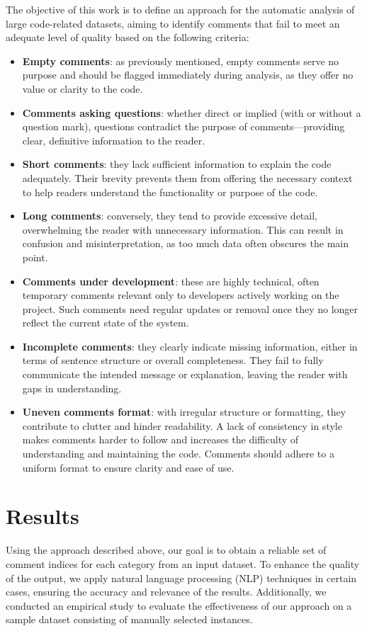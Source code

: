 \noindent The objective of this work is to define an approach for the automatic analysis of large code-related datasets, aiming to identify comments that fail to meet an adequate level of quality based on the following criteria:
\begin{itemize}
	\item \textbf{Empty comments}: as previously mentioned, empty comments serve no purpose and should be flagged immediately during analysis, as they offer no value or clarity to the code.
	\item \textbf{Comments asking questions}: whether direct or implied (with or without a question mark), questions contradict the purpose of comments—providing clear, definitive information to the reader.
	\item \textbf{Short comments}: they lack sufficient information to explain the code adequately. Their brevity prevents them from offering the necessary context to help readers understand the functionality or purpose of the code.
	\item \textbf{Long comments}: conversely, they tend to provide excessive detail, overwhelming the reader with unnecessary information. This can result in confusion and misinterpretation, as too much data often obscures the main point.
	\item \textbf{Comments under development}: these are highly technical, often temporary comments relevant only to developers actively working on the project. Such comments need regular updates or removal once they no longer reflect the current state of the system.
	\item \textbf{Incomplete comments}: they clearly indicate missing information, either in terms of sentence structure or overall completeness. They fail to fully communicate the intended message or explanation, leaving the reader with gaps in understanding.
	\item \textbf{Uneven comments format}: with irregular structure or formatting, they contribute to clutter and hinder readability. A lack of consistency in style makes comments harder to follow and increases the difficulty of understanding and maintaining the code. Comments should adhere to a uniform format to ensure clarity and ease of use.
\end{itemize}

\section{Results}
Using the approach described above, our goal is to obtain a reliable set of comment indices for each category from an input dataset. To enhance the quality of the output, we apply natural language processing (NLP) techniques in certain cases, ensuring the accuracy and relevance of the results. Additionally, we conducted an empirical study to evaluate the effectiveness of our approach on a sample dataset consisting of manually selected instances.

